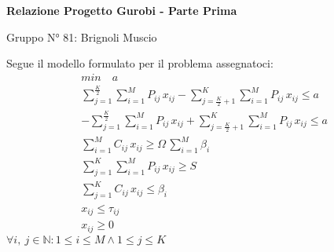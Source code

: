 \documentclass[11pt]{article}
\begin{document}
  \begin{center}
    \Large\textbf{Relazione Progetto Gurobi - Parte Prima}

    \small Gruppo N° 81: Brignoli Muscio
  \end{center}\bigskip

  Segue il modello formulato per il problema assegnatoci:
  \begin{gather*}
    min\quad a \\
    \sum_{j=1}^{\frac{K}{2}}\sum_{i=1}^{M}P_{ij}\,x_{ij}-\sum_{j=\frac{K}{2}+1}^{K}\sum_{i=1}^{M}P_{ij}\,x_{ij}\leq a \\
    -\sum_{j=1}^{\frac{K}{2}}\sum_{i=1}^{M}P_{ij}\,x_{ij}+\sum_{j=\frac{K}{2}+1}^{K}\sum_{i=1}^{M}P_{ij}\,x_{ij}\leq a \\
    \sum_{i=1}^M C_{ij}\,x_{ij}\geq \Omega\,\sum_{i=1}^M\beta_i \\
    \sum_{j=1}^{K}\sum_{i=1}^{M} P_{ij}\,x_{ij}\geq S \\
    \sum_{j=1}^K C_{ij}\,x_{ij}\leq \beta_i \\
    x_{ij}\leq \tau_{ij} \\
    x_{ij}\geq 0
  \end{gather*}
  \hfill$\forall i,\:j\in\mathbb{N}:1\leq i\leq M\wedge1\leq j\leq K$\bigskip
\end{document}
